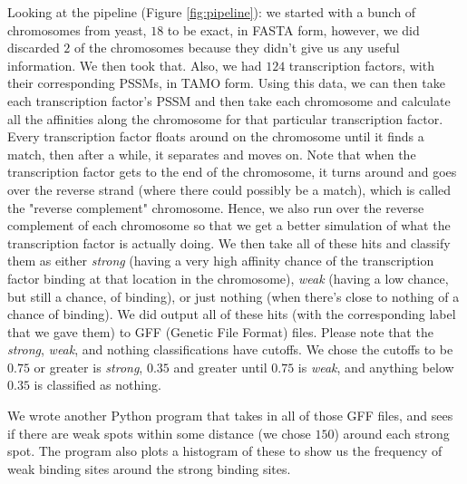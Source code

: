 \documentclass{article}
\newcommand{\tab}{\hspace{9mm}}
\begin{document}
\tab Looking at the pipeline (Figure \ref{fig:pipeline}): we started with a bunch of chromosomes from yeast, $18$ to be exact, in FASTA form, however, we did discarded $2$ of the chromosomes because they didn't give us any useful information. We then took that. Also, we had $124$ transcription factors, with their corresponding PSSMs, in TAMO form. Using this data, we can then take each transcription factor's PSSM and then take each chromosome and calculate all the affinities along the chromosome for that particular transcription factor. Every transcription factor floats around on the chromosome until it finds a match, then after a while, it separates and moves on. Note that when the transcription factor gets to the end of the chromosome, it turns around and goes over the reverse strand (where there could possibly be a match), which is called the "reverse complement" chromosome. Hence, we also run over the reverse complement of each chromosome so that we get a better simulation of what the transcription factor is actually doing. We then take all of these hits and classify them as either \textit{strong} (having a very high affinity chance of the transcription factor binding at that location in the chromosome), \textit{weak} (having a low chance, but still a chance, of binding), or just nothing (when there's close to nothing of a chance of binding). We did output all of these hits (with the corresponding label that we gave them) to GFF (Genetic File Format) files. Please note that the \textit{strong}, \textit{weak}, and nothing classifications have cutoffs. We chose the cutoffs to be $0.75$ or greater is \textit{strong}, $0.35$ and greater until $0.75$ is \textit{weak}, and anything below $0.35$ is classified as nothing.


\tab We wrote another Python program that takes in all of those GFF files, and sees if there are weak spots within some distance (we chose $150$) around each strong spot. The program also plots a histogram of these to show us the frequency of weak binding sites around the strong binding sites.

\end{document}
